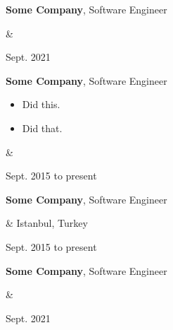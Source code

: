 \documentclass[10pt, letterpaper]{article}
\newenvironment{highlights}{
        \begin{itemize}[
                topsep=0pt,
                parsep=0.10 cm,
                partopsep=0pt,
                itemsep=0pt,
                after=\vspace{-1\baselineskip},
                leftmargin=0.4 cm + 3pt
            ]
    }{
        \end{itemize}
    } %
\let\originalTabularx\tabularx
\let\originalEndTabularx\endtabularx
\renewenvironment{tabularx}{\bgroup\centering\originalTabularx}{\originalEndTabularx\par\egroup}
\begin{document}
        \vspace{0.2 cm}
        \begin{tabularx}{
            \textwidth-0.4 cm-0.13cm
        }{
            K{0.2 cm}
            R{4.1 cm}
        }
            \textbf{Some Company}, Software Engineer

            \vspace{0.10 cm}

            &
            

            Sept. 2021
        \end{tabularx}

        \vspace{0.2 cm}
        \begin{tabularx}{
            \textwidth-0.4 cm-0.13cm
        }{
            K{0.2 cm}
            R{4.1 cm}
        }
            \textbf{Some Company}, Software Engineer

            \vspace{0.10 cm}

            \begin{highlights}
                \item Did this.
                \item Did that.
            \end{highlights}
            &
            

            Sept. 2015 to present
        \end{tabularx}

        \vspace{0.2 cm}
        \begin{tabularx}{
            \textwidth-0.4 cm-0.13cm
        }{
            K{0.2 cm}
            R{4.1 cm}
        }
            \textbf{Some Company}, Software Engineer

            \vspace{0.10 cm}

            &
            Istanbul, Turkey

            Sept. 2015 to present
        \end{tabularx}

        \vspace{0.2 cm}
        \begin{tabularx}{
            \textwidth-0.4 cm-0.13cm
        }{
            K{0.2 cm}
            R{4.1 cm}
        }
            \textbf{Some Company}, Software Engineer

            \vspace{0.10 cm}

            &
            

            Sept. 2021
        \end{tabularx}
\end{document}
